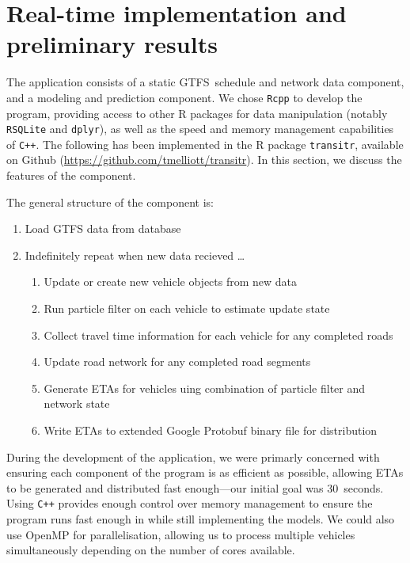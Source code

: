 \section{Real-time implementation and preliminary results}
\label{sec:rt}

The application consists of a
static GTFS~schedule and network data component,
and a \rt modeling and prediction component.
We chose \verb+Rcpp+ to develop the program,
providing access to other R packages for data manipulation 
(notably \verb+RSQLite+ and \verb+dplyr+),
as well as the speed and memory management capabilities of \verb|C++|. 
The following has been implemented in the R package
\verb+transitr+, available on Github (\url{https://github.com/tmelliott/transitr}).
In this section, we discuss the features of the \rt component.

The general structure of the \rt component is:
\begin{enumerate}
\item Load GTFS data from database
\item Indefinitely repeat when new data recieved \ldots
\begin{enumerate}
    \item Update or create new vehicle objects from new data
    \item Run particle filter on each vehicle to estimate update state
    \item Collect travel time information for each vehicle for any completed roads
    \item Update road network for any completed road segments
    \item Generate ETAs for vehicles uing combination of particle filter and network state
    \item Write ETAs to extended Google Protobuf binary file for distribution
\end{enumerate}
\end{enumerate}


During the development of the application,
we were primarly concerned with ensuring each component of the program
is as efficient as possible,
allowing ETAs to be generated and distributed fast enough---our initial goal was 30~seconds.
Using \verb|C++| provides enough control over memory management
to ensure the program runs fast enough in \rt 
while still implementing the models.
We could also use OpenMP for parallelisation,
allowing us to process multiple vehicles simultaneously
depending on the number of cores available.


